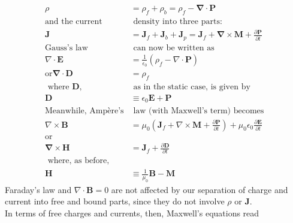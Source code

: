 \begin{align*}
 \rho&=\rho_{f}+\rho_{b}=\rho_{f}-\boldsymbol{\nabla} \cdot \mathbf{P}\\
  \text{and the current}&\text{ density into three parts:}\\
\mathbf{J}&=\mathbf{J}_{f}+\mathbf{J}_{b}+\mathbf{J}_{p}=\mathbf{J}_{f}+\mathbf{\nabla} \times \mathbf{M}+\frac{\partial \mathbf{P}}{\partial t}\\
 \text{Gauss's law}&\text{ can now be written as }\\
 \nabla \cdot \mathbf{E}&=\frac{1}{\epsilon_{0}}\left(\rho_{f}-\nabla \cdot \mathbf{P}\right)\\
  \text{or}\boldsymbol{\nabla} \cdot \mathbf{D}&=\rho_{f} \\
 \text{ where $\mathbf{D}$,}&\text{ as in the static case, is given by }\\
  \mathbf{D} &\equiv \epsilon_{0} \mathbf{E}+\mathbf{P}\\
  \text{Meanwhile, Ampère's}&\text{ law (with Maxwell's term) becomes }\\
  \nabla \times \mathbf{B}&=\mu_{0}\left(\mathbf{J}_{f}+\nabla \times \mathbf{M}+\frac{\partial \mathbf{P}}{\partial t}\right)+\mu_{0} \epsilon_{0} \frac{\partial \mathbf{E}}{\partial t}\\
  \text{or}\\
  \boldsymbol{\nabla} \times \mathbf{H}&=\mathbf{J}_{f}+\frac{\partial \mathbf{D}}{\partial t}\\
  \text{ where, as before,}\\
  \mathbf{H} &\equiv \frac{1}{\mu_{0}} \mathbf{B}-\mathbf{M}
\end{align*}
Faraday's law and $\nabla \cdot \mathbf{B}=0$ are not affected by our separation of charge and current into free and bound parts, since they do not involve $\rho$ or $\mathbf{J}$. \\
In terms of free charges and currents, then, Maxwell's equations read
\begin{center}
\end{center}
